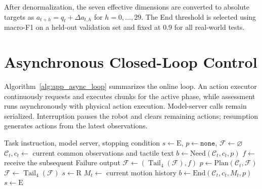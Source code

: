 After denormalization, the seven effective dimensions are converted to absolute targets as $a_{t+h}=q_t+\Delta a_{t,h}$ for $h=0,\ldots,29$. The End threshold is selected using macro-F1 on a held-out validation set and fixed at 0.9 for all real-world tests.

\section{Asynchronous Closed-Loop Control}
\label{sec:app_async_control}

Algorithm~\ref{alg:app_async_loop} summarizes the online loop. An action executor continuously requests and executes chunks for the active phase, while assessment runs asynchronously with physical action execution. Model-server calls remain serialized. Interruption pauses the robot and clears remaining actions; resumption generates actions from the latest observations.

\begin{algorithm}[t]
\caption{Asynchronous execution and recovery}
\label{alg:app_async_loop}
\small
\begin{algorithmic}[1]
\Require Task instruction, model server, stopping condition
\State $s\gets\mathrm{E}$, $p\gets\texttt{none}$, $\mathcal F\gets\varnothing$
\State {} 
 
    \State $\mathcal C_t,c_t\gets$ current common observations and tactile text
        \State $b\gets\mathrm{Need}(\mathcal C_t,c_t,p)$
            \State {}
            \State $f\gets$ receive the subsequent Failure output
            \State $\mathcal F\gets(\operatorname{Tail}_4(\mathcal F),f)$
            \State $p\gets\mathrm{Plan}(\mathcal C_t,\mathcal F)$
            \State $\mathcal F\gets\operatorname{Tail}_4(\mathcal F)$
            \State $s\gets\mathrm{R}$
            \State {}
        \EndIf
    \Else
        \State $M_t\gets$ current motion history
        \State $b\gets\mathrm{End}(\mathcal C_t,c_t,M_t,p)$
            \State {}
            \State $s\gets\mathrm{E}$
            \State {}
        \EndIf
    \EndIf
\EndWhile
\State {}
\end{algorithmic}
\end{algorithm}

